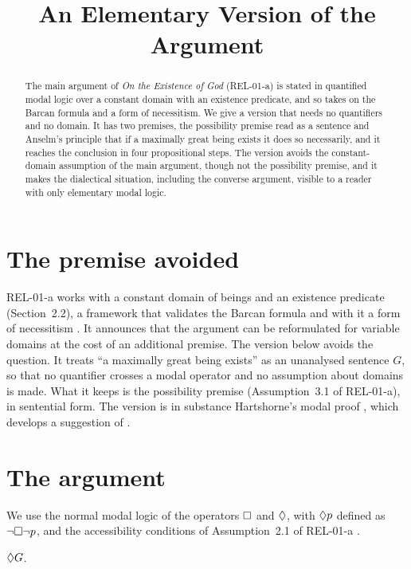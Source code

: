 \documentclass{situationist-preprint}
\title{An Elementary Version of the Argument}
\begin{document}
\maketitle

\begin{abstract}
The main argument of \emph{On the Existence of God} (REL-01-a) is stated in quantified modal logic over a constant domain with an existence predicate, and so takes on the Barcan formula and a form of necessitism. We give a version that needs no quantifiers and no domain. It has two premises, the possibility premise read as a sentence and Anselm's principle that if a maximally great being exists it does so necessarily, and it reaches the conclusion in four propositional steps. The version avoids the constant-domain assumption of the main argument, though not the possibility premise, and it makes the dialectical situation, including the converse argument, visible to a reader with only elementary modal logic.
\end{abstract}

\section{The premise avoided}

REL-01-a works with a constant domain of beings and an existence predicate (Section~2.2), a framework that validates the Barcan formula and with it a form of necessitism \citep{Williamson2013}. It announces that the argument can be reformulated for variable domains at the cost of an additional premise. The version below avoids the question. It treats \enquote{a maximally great being exists} as an unanalysed sentence $G$, so that no quantifier crosses a modal operator and no assumption about domains is made. What it keeps is the possibility premise (Assumption~3.1 of REL-01-a), in sentential form. The version is in substance Hartshorne's modal proof \citep{Hartshorne1962}, which develops a suggestion of \citet{Malcolm1960}.

\section{The argument}

We use the normal modal logic of the operators $\mathord{\Box}$ and $\mathord{\Diamond}$, with $\mathord{\Diamond} p$ defined as $\neg\mathord{\Box}\neg p$, and the accessibility conditions of Assumption~2.1 of REL-01-a \citep{HughesCresswell1996}.

\begin{assumption}[Possibility]\label{a:pos}
$\mathord{\Diamond} G$.
\end{assumption}
\end{document}
